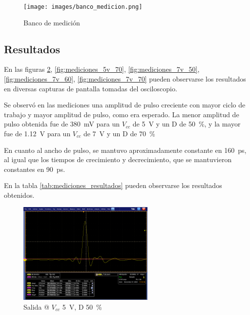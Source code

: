 \begin{figure}
  \centering
    \texttt{[image: images/banco\_medicion.png]}
    \caption{Banco de medición}
    \label{fig:banco_medicion}
\end{figure}

\subsection{Resultados}

En las figuras \ref{fig:mediciones_5v_50}, \ref{fig:mediciones_5v_70},
\ref{fig:mediciones_7v_50}, \ref{fig:mediciones_7v_60},
\ref{fig:mediciones_7v_70} pueden observarse los resultados en diversas capturas de pantalla
tomadas del osciloscopio.

Se observó en las mediciones una amplitud de pulso creciente con mayor ciclo de
trabajo y mayor amplitud de pulso, como era esperado. La menor amplitud de pulso
obtenida fue de \qty{380}{\milli\volt} para un $V_{cc}$ de \qty{5}{\volt} y un D
de \qty{50}{\percent}, y la mayor fue de \qty{1.12}{\volt} para un $V_{cc}$
de \qty{7}{\volt} y un D de \qty{70}{\percent}

En cuanto al ancho de pulso, se mantuvo aproximadamente constante en
\qty{160}{\pico\second}, al igual que los tiempos de crecimiento y
decrecimiento, que se mantuvieron constantes en \qty{90}{\pico\second}.

En la tabla \ref{tab:mediciones_resultados} pueden observarse los resultados obtenidos.

\begin{figure}
  \centering
    \includegraphics[width=0.6\textwidth]{images/mediciones/vcc_5v_duty_50.png}
    \caption{Salida @ $V_{cc}$ \qty{5}{\volt}, D \qty{50}{\percent} }
    \label{fig:mediciones_5v_50}
\end{figure}

